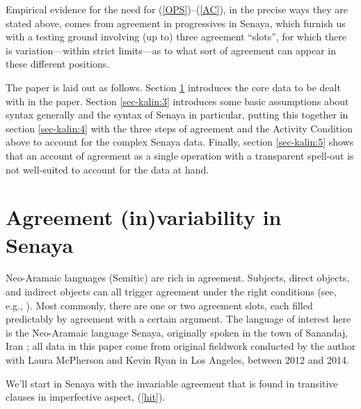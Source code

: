 \documentclass[output=paper
,modfonts
,nonflat]{langsci/langscibook}
\begin{document}
\noindent Empirical evidence for the need for (\ref{OPS})--(\ref{AC}), in the precise ways they are stated above, comes from agreement in progressives in Senaya, which furnish us with a testing ground involving (up to) three agreement ``slots'', for which there is variation---within strict limits---as to what sort of agreement can appear in these different positions.

The paper is laid out as follows. Section \ref{sec-kalin:2} introduces the core data to be dealt with in the paper. Section \ref{sec-kalin:3} introduces some basic assumptions about syntax generally and the syntax of Senaya in particular, putting this together in section \ref{sec-kalin:4} with the three steps of agreement and the Activity Condition above to account for the complex Senaya data. Finally, section \ref{sec-kalin:5} shows that an account of agreement as a single operation with a transparent spell-out is not well-suited to account for the data at hand.

\section{Agreement (in)variability in Senaya} \label{sec-kalin:2}

Neo-Aramaic languages (Semitic) are rich in agreement. Subjects, direct objects, and indirect objects can all trigger agreement under the right conditions (see, e.g., \citealt{DoronKhan12,KalinvanUrk15}). Most commonly, there are one or two agreement slots, each filled predictably by agreement with a certain argument. The language of interest here is the Neo-Aramaic language Senaya, originally spoken in the town of Sanandaj, Iran \citep{Panoussi90}; all data in this paper come from original fieldwork conducted by the author with Laura McPherson and Kevin Ryan in Los Angeles, between 2012 and 2014.

We'll start in Senaya with the invariable agreement that is found in transitive clauses in imperfective aspect, (\ref{hit}).

\eal \label{hit}
\zl
\end{document}
